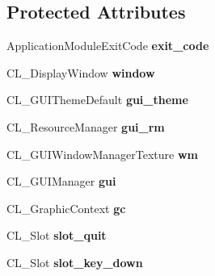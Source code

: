 \subsection*{Protected Attributes}
\begin{DoxyCompactItemize}
\item 
\hypertarget{classApplicationModule_a148d32ab67b53a89631ca60514dac4a6}{
ApplicationModuleExitCode {\bfseries exit\_\-code}}
\label{classApplicationModule_a148d32ab67b53a89631ca60514dac4a6}

\item 
\hypertarget{classApplicationModule_acf67b00ada6051624eab16d1594447e4}{
CL\_\-DisplayWindow {\bfseries window}}
\label{classApplicationModule_acf67b00ada6051624eab16d1594447e4}

\item 
\hypertarget{classApplicationModule_a507dc5dce4df518924b9a88f1816f6e5}{
CL\_\-GUIThemeDefault {\bfseries gui\_\-theme}}
\label{classApplicationModule_a507dc5dce4df518924b9a88f1816f6e5}

\item 
\hypertarget{classApplicationModule_a0169726ad6be80b99e933cdb629e73cf}{
CL\_\-ResourceManager {\bfseries gui\_\-rm}}
\label{classApplicationModule_a0169726ad6be80b99e933cdb629e73cf}

\item 
\hypertarget{classApplicationModule_a24ca28ca6ca0b1fc9ff54115c4d7f1aa}{
CL\_\-GUIWindowManagerTexture {\bfseries wm}}
\label{classApplicationModule_a24ca28ca6ca0b1fc9ff54115c4d7f1aa}

\item 
\hypertarget{classApplicationModule_a615058f2f96167dcfdefb98e711a7197}{
CL\_\-GUIManager {\bfseries gui}}
\label{classApplicationModule_a615058f2f96167dcfdefb98e711a7197}

\item 
\hypertarget{classApplicationModule_a847a964b766c02650275136054fbf2cf}{
CL\_\-GraphicContext {\bfseries gc}}
\label{classApplicationModule_a847a964b766c02650275136054fbf2cf}

\item 
\hypertarget{classApplicationModule_aeb1efd5a0360aa4b0b631f0ecd73782e}{
CL\_\-Slot {\bfseries slot\_\-quit}}
\label{classApplicationModule_aeb1efd5a0360aa4b0b631f0ecd73782e}

\item 
\hypertarget{classApplicationModule_ae1ec82a52e36716d11cf1ac25d4e81ac}{
CL\_\-Slot {\bfseries slot\_\-key\_\-down}}
\label{classApplicationModule_ae1ec82a52e36716d11cf1ac25d4e81ac}


\end{DoxyCompactItemize}
